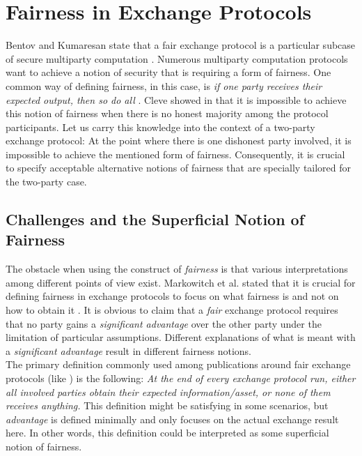 \documentclass{cacthesis}
\begin{document}
    \chapter{Fairness in Exchange Protocols}
        Bentov and Kumaresan state that a fair exchange protocol is a particular subcase of secure multiparty computation \cite{10.1007/978-3-662-44381-1_24}. Numerous multiparty computation protocols want to achieve a notion of security that is requiring a form of fairness. One common way of defining fairness, in this case, is \textit{if one party receives their expected output, then so do all} \cite{10.1007/978-3-540-79263-5_8}. Cleve showed in \cite{10.1145/12130.12168} that it is impossible to achieve this notion of fairness when there is no honest majority among the protocol participants. Let us carry this knowledge into the context of a two-party exchange protocol: At the point where there is one dishonest party involved, it is impossible to achieve the mentioned form of fairness. Consequently, it is crucial to specify acceptable alternative notions of fairness that are specially tailored for the two-party case. 
        
        \section{Challenges and the Superficial Notion of Fairness}
		The obstacle when using the construct of \textit{fairness} is that various interpretations among different points of view exist. Markowitch et al. stated that it is crucial for defining fairness in exchange protocols to focus on what fairness is and not on how to obtain it \cite{10.1007/3-540-36552-4_31}. It is obvious to claim that a \textit{fair} exchange protocol requires that no party gains a \textit{significant advantage} over the other party under the limitation of particular assumptions. Different explanations of what is meant with a \textit{significant advantage} result in different fairness notions. \\
        The primary definition commonly used among publications around fair exchange protocols (like \cite{10.1145/266420.266426} \cite{asyncOptiFairEx1998} \cite{remarksOnFairEx2000})  is the following: \textit{At the end of every exchange protocol run, either all involved parties obtain their expected information/asset, or none of them receives anything.} This definition might be satisfying in some scenarios, but \textit{advantage} is defined minimally and only focuses on the actual exchange result here. In other words, this definition could be interpreted as some superficial notion of fairness.
        
\end{document}
